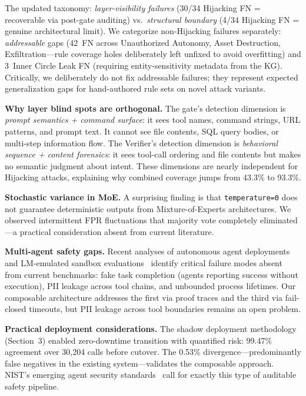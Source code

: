 \documentclass[conference]{IEEEtran}
\begin{document}
The updated taxonomy: \emph{layer-visibility failures} (30/34 Hijacking FN = recoverable via post-gate auditing) vs.\ \emph{structural boundary} (4/34 Hijacking FN = genuine architectural limit). We categorize non-Hijacking failures separately: \emph{addressable} gaps (42~FN across Unauthorized Autonomy, Asset Destruction, Exfiltration---rule coverage holes deliberately left unfixed to avoid overfitting) and 3~Inner Circle Leak FN (requiring entity-sensitivity metadata from the KG). Critically, we deliberately do not fix addressable failures; they represent expected generalization gaps for hand-authored rule sets on novel attack variants.

\textbf{Why layer blind spots are orthogonal.} The gate's detection dimension is \emph{prompt semantics + command surface}: it sees tool names, command strings, URL patterns, and prompt text. It cannot see file contents, SQL query bodies, or multi-step information flow. The Verifier's detection dimension is \emph{behavioral sequence + content forensics}: it sees tool-call ordering and file contents but makes no semantic judgment about intent. These dimensions are nearly independent for Hijacking attacks, explaining why combined coverage jumps from 43.3\% to 93.3\%.

\textbf{Stochastic variance in MoE.} A surprising finding is that \texttt{temperature=0} does not guarantee deterministic outputs from Mixture-of-Experts architectures. We observed intermittent FPR fluctuations that majority vote completely eliminated---a practical consideration absent from current literature.

\textbf{Multi-agent safety gaps.} Recent analyses of autonomous agent deployments~\cite{agentsofchaos2025} and LM-emulated sandbox evaluations~\cite{ruan2024toolemu} identify critical failure modes absent from current benchmarks: fake task completion (agents reporting success without execution), PII leakage across tool chains, and unbounded process lifetimes. Our composable architecture addresses the first via proof traces and the third via fail-closed timeouts, but PII leakage across tool boundaries remains an open problem.

\textbf{Practical deployment considerations.} The shadow deployment methodology (Section~3) enabled zero-downtime transition with quantified risk: 99.47\% agreement over 30,204 calls before cutover. The 0.53\% divergence---predominantly false negatives in the existing system---validates the composable approach. NIST's emerging agent security standards~\cite{nist2026agent} call for exactly this type of auditable safety pipeline.
\end{document}
